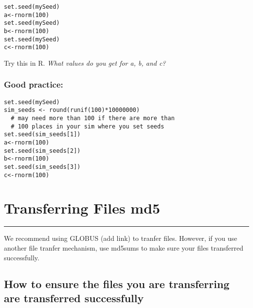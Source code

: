 \documentclass[
  letterpaper,
  DIV=11,
  numbers=noendperiod]{scrreprt}
\begin{document}
\begin{verbatim}
set.seed(mySeed)
a<-rnorm(100)
set.seed(mySeed)
b<-rnorm(100)
set.seed(mySeed)
c<-rnorm(100)
\end{verbatim}

Try this in R. \emph{What values do you get for a, b, and c?}

\hypertarget{good-practice}{%
\subsection*{\texorpdfstring{\textbf{Good
practice:}}{Good practice:}}\label{good-practice}}

\begin{verbatim}
set.seed(mySeed)
sim_seeds <- round(runif(100)*10000000) 
  # may need more than 100 if there are more than 
  # 100 places in your sim where you set seeds
set.seed(sim_seeds[1])
a<-rnorm(100)
set.seed(sim_seeds[2])
b<-rnorm(100)
set.seed(sim_seeds[3])
c<-rnorm(100)
\end{verbatim}

\hypertarget{transferring-files-md5}{%
\chapter{Transferring Files md5}\label{transferring-files-md5}}

\begin{center}\rule{0.5\linewidth}{0.5pt}\end{center}

We recommend using GLOBUS (add link) to tranfer files. However, if you
use another file tranfer mechanism, use md5sums to make sure your files
transferred successfully.

\hypertarget{how-to-ensure-the-files-you-are-transferring-are-transferred-successfully}{%
\section*{\texorpdfstring{\textbf{How to ensure the files you are
transferring are transferred
successfully}}{How to ensure the files you are transferring are transferred successfully}}\label{how-to-ensure-the-files-you-are-transferring-are-transferred-successfully}}

\end{document}
